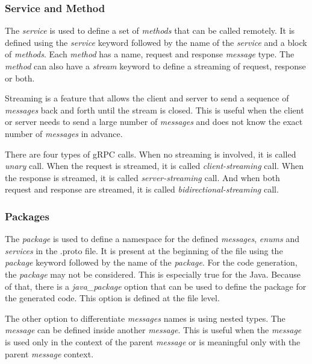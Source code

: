 \subsubsection{Service and Method}
The \textit{service} is used to define a set of \textit{methods} that can be called remotely.
It is defined using the \textit{service} keyword followed by the name of the \textit{service} and a block of \textit{methods}.
Each \textit{method} has a name, request and response \textit{message} type.
The \textit{method} can also have a \textit{stream} keyword to define a streaming of request, response or both.
\cite{protobuf-proto3}

Streaming is a feature that allows the client and server to send a sequence of \textit{messages} back and forth until the stream is closed.
This is useful when the client or server needs to send a large number of \textit{messages} and does not know the exact number of \textit{messages} in advance.
\cite{protobuf-proto3}

There are four types of gRPC calls.
When no streaming is involved, it is called \textit{unary} call.
When the request is streamed, it is called \textit{client-streaming} call.
When the response is streamed, it is called \textit{server-streaming} call.
And when both request and response are streamed, it is called \textit{bidirectional-streaming} call.
\cite{grpc-core-concept}

\subsubsection{Packages}
The \textit{package} is used to define a namespace for the defined \textit{messages}, \textit{enums} and \textit{services} in the .proto file.
It is present at the beginning of the file using the \textit{package} keyword followed by the name of the \textit{package}.
For the code generation, the \textit{package} may not be considered.
This is especially true for the Java.
Because of that, there is a \textit{java\_package} option that can be used to define the package for the generated code.
This option is defined at the file level.
\cite{protobuf-proto3}

The other option to differentiate \textit{messages} names is using nested types.
The \textit{message} can be defined inside another \textit{message}.
This is useful when the \textit{message} is used only in the context of the parent \textit{message} or is meaningful only with the parent \textit{message} context.
\cite{protobuf-proto3}

